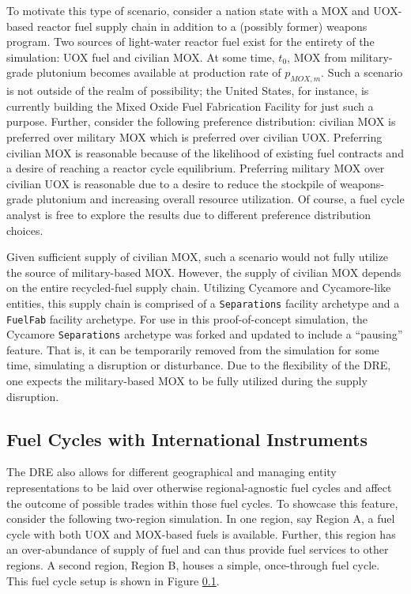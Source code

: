 To motivate this type of scenario, consider a nation state with a MOX and
UOX-based reactor fuel supply chain in addition to a (possibly former) weapons
program. Two sources of light-water reactor fuel exist for the entirety of the
simulation: UOX fuel and civilian MOX. At some time, $t_0$, MOX from
military-grade plutonium becomes available at production rate of $p_{MOX,
  m}$. Such a scenario is not outside of the realm of possibility; the United
States, for instance, is currently building the Mixed Oxide Fuel Fabrication
Facility for just such a purpose. Further, consider the following preference
distribution: civilian MOX is preferred over military MOX which is preferred
over civilian UOX. Preferring civilian MOX is reasonable because of the
likelihood of existing fuel contracts and a desire of reaching a reactor cycle
equilibrium. Preferring military MOX over civilian UOX is reasonable due to a
desire to reduce the stockpile of weapons-grade plutonium and increasing overall
resource utilization. Of course, a fuel cycle analyst is free to explore the
results due to different preference distribution choices.

Given sufficient supply of civilian MOX, such a scenario would not fully utilize
the source of military-based MOX. However, the supply of civilian MOX depends on
the entire recycled-fuel supply chain. Utilizing Cycamore and Cycamore-like
entities, this supply chain is comprised of a \texttt{Separations} facility
archetype and a \texttt{FuelFab} facility archetype. For use in this
proof-of-concept simulation, the Cycamore \texttt{Separations} archetype was
forked and updated to include a ``pausing'' feature. That is, it can be
temporarily removed from the simulation for some time, simulating a disruption
or disturbance. Due to the flexibility of the DRE, one expects the
military-based MOX to be fully utilized during the supply disruption.







\subsection{Fuel Cycles with International Instruments}

The DRE also allows for different geographical and managing entity
representations to be laid over otherwise regional-agnostic fuel cycles and
affect the outcome of possible trades within those fuel cycles. To showcase this
feature, consider the following two-region simulation. In one region, say Region
A, a fuel cycle with both UOX and MOX-based fuels is available. Further, this
region has an over-abundance of supply of fuel and can thus provide fuel
services to other regions. A second region, Region B, houses a simple,
once-through fuel cycle. This fuel cycle setup is shown in Figure \ref{}.

